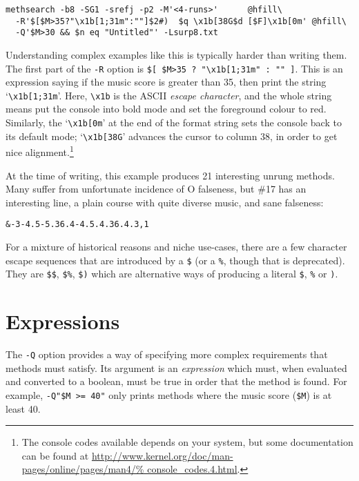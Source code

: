 \documentclass[a4paper,11pt,oneside]{book}
\makeatletter
\def\textitidx#1{\textit{#1}\index{#1}}
\newcommand{\oi}[1]{\index{#1@{\hspace*{-\optwidth}\texttt{-}\texttt{#1}}}}
\newcommand{\fspec}[1]{\index{#1@{\hspace*{-\fspecwidth}\texttt{\$#1}}}}
\makeatother
\begin{document}
\begin{Verbatim}[commandchars=@~~]
methsearch -b8 -SG1 -srefj -p2 -M'<4-runs>'      @hfill\
  -R'$[$M>35?"\x1b[1;31m":""]$2#)  $q \x1b[38G$d [$F]\x1b[0m' @hfill\
  -Q'$M>30 && $n eq "Untitled"' -Lsurp8.txt
\end{Verbatim}

Understanding complex examples like this is typically harder than
writing them.  The first part of the \verb+-R+ option is 
\verb+$[ $M>35 ? "\x1b[1;31m" : "" ]+.  This is an expression saying 
if the music score is greater than 35, 
then print the string `\verb"\x1b[1;31m"'.  Here, \verb+\x1b+
is the ASCII \textitidx{escape character}, and the whole string means
put the console into bold mode and set the 
foreground colour to red.  Similarly, the `\verb"\x1b[0m"'
at the end of the format string sets the console back to its default mode;
`\verb+\x1b[38G+' advances the cursor to column 38, in order to get nice
alignment.\footnote{The console codes\index{console codes} available
depends on your system, but some 
documentation can be found at
\url{http://www.kernel.org/doc/man-pages/online/pages/man4/%
console_codes.4.html}.}

At the time of writing, this example produces 21 interesting unrung methods.
Many suffer from unfortunate incidence of O falseness, but \#17 has an 
interesting line, a plain course with quite diverse music, and sane falseness:
\begin{Verbatim}
&-3-4.5-5.36.4-4.5.4.36.4.3,1
\end{Verbatim}

For a mixture of historical reasons and niche use-cases, there are a few 
character escape sequences that are introduced by a \verb+$+ (or a \verb+%+,
though that is deprecated).  They are \verb+$$+, \verb+$%+, \verb+$)+ which
are alternative ways of producing a literal \verb+$+, \verb+%+ or \verb+)+.

\section{Expressions}\label{expr}

The \verb+-Q+\oi{Q} option provides a way of specifying more 
complex requirements that methods must satisfy.  Its argument is an 
\textit{expression} which must, when evaluated and converted to a boolean, 
must be true in order that the method is found.  For example, 
\verb+-Q"$M >= 40"+ only prints methods where the music score 
(\verb+$M+)\fspec{M} is at least 40. 
\end{document}
